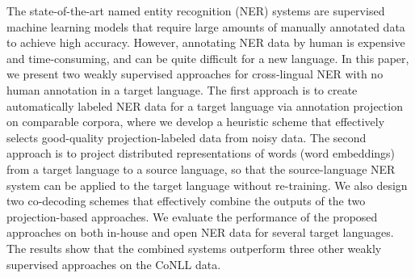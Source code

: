 The state-of-the-art named entity recognition (NER) systems are supervised machine learning models that require large amounts of manually annotated data to achieve high accuracy. However, annotating NER data by human is expensive and time-consuming, and can be quite difficult for a new language. In this paper, we present two weakly supervised approaches for cross-lingual NER with no human annotation in a target language. The first approach is to create automatically labeled NER data for a target language via annotation projection on comparable corpora, where we develop a heuristic scheme that effectively selects good-quality projection-labeled data from noisy data. The second approach is to project distributed representations of words (word embeddings) from a target language to a source language, so that the source-language NER system can be applied to the target language without re-training. We also design two co-decoding schemes that effectively combine the outputs of the two projection-based approaches. We evaluate the performance of the proposed approaches on both in-house and open NER data for several target languages. The results show that the combined systems outperform three other weakly supervised approaches on the CoNLL data.
